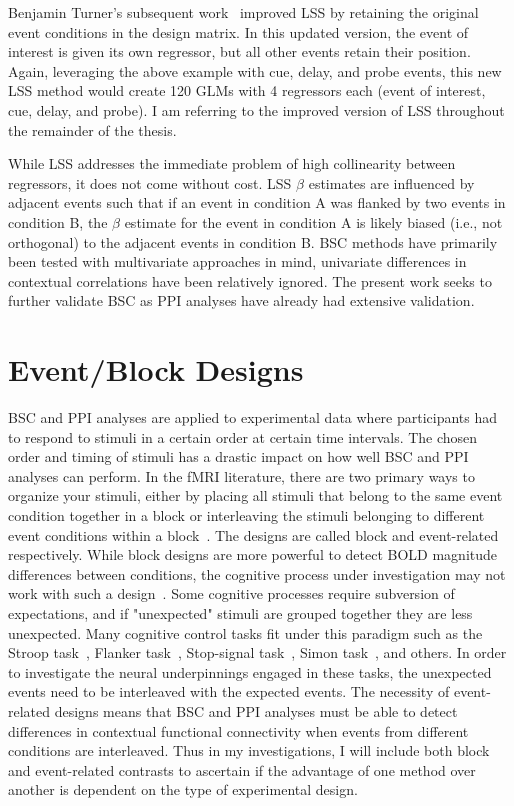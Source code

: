 \documentclass[phd,appendix,figures]{uithesis}
\begin{document}
Benjamin Turner's subsequent work~\cite{Turner2012a} improved LSS by retaining
the original event conditions in the design matrix.
In this updated version, the event of interest is given its own regressor, but all
other events retain their position.
Again, leveraging the above example with cue, delay, and probe events,
this new LSS method would create 120 GLMs with 4 regressors each (event of interest, cue, delay, and probe).
I am referring to the improved version of LSS throughout the remainder of the thesis.

While LSS addresses the immediate problem of high collinearity between regressors,
it does not come without cost.
LSS $\beta$ estimates are influenced by adjacent events such that if an event in condition A
was flanked by two events in condition B, the $\beta$ estimate for the event in condition A
is likely biased (i.e., not orthogonal) to the adjacent events in condition B.
BSC methods have primarily been tested with multivariate approaches in mind, univariate
differences in contextual correlations have been relatively ignored.
The present work seeks to further validate BSC as PPI analyses have already had
extensive validation.

\section{Event/Block Designs}

BSC and PPI analyses are applied to experimental data where participants had to respond
to stimuli in a certain order at certain time intervals.
The chosen order and timing of stimuli has a drastic impact on how well BSC and PPI analyses
can perform.
In the fMRI literature, there are two primary ways to organize your stimuli,
either by placing all stimuli that belong to the same event condition together
in a block or interleaving the stimuli belonging to different event conditions
within a block~\cite{Friston1995b,Buckner1996}.
The designs are called block and event-related respectively.
While block designs are more powerful to detect BOLD magnitude differences
between conditions, the cognitive process under investigation may not work with
such a design~\cite{Friston1999}.
Some cognitive processes require subversion of expectations, and if "unexpected"
stimuli are grouped together they are less unexpected.
Many cognitive control tasks fit under this paradigm such as the
Stroop task~\cite{Stroop1935}, Flanker task~\cite{Eriksen1974a}, Stop-signal task~\cite{Logan1982},
Simon task~\cite{Simon1963}, and others.
In order to investigate the neural underpinnings engaged in these tasks, the unexpected events
need to be interleaved with the expected events.
The necessity of event-related designs means that BSC and PPI analyses must be able to
detect differences in contextual functional connectivity when events from different conditions
are interleaved.
Thus in my investigations, I will include both block and event-related contrasts
to ascertain if the advantage of one method over another is dependent on the type of experimental design.
\end{document}
